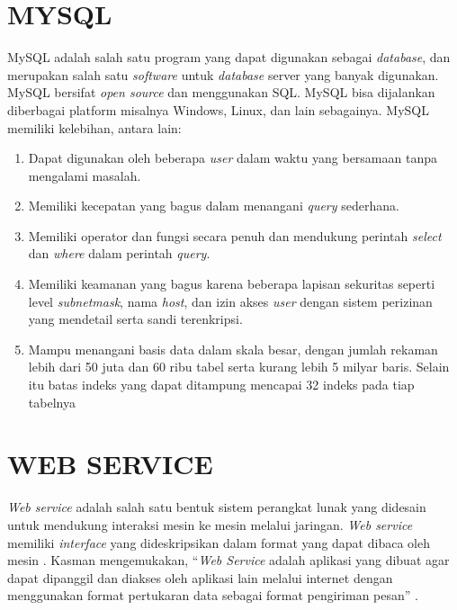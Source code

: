 
\section{\uppercase{MySQL}}
MySQL adalah salah satu program yang dapat digunakan sebagai \textit{database}, dan merupakan salah satu \textit{software} untuk \textit{database} server yang banyak digunakan. MySQL bersifat \textit{open source} dan menggunakan SQL. MySQL bisa dijalankan diberbagai platform misalnya Windows, Linux, dan lain sebagainya. MySQL memiliki kelebihan, antara lain: \citep{orlando2017aplikasi}

\begin{enumerate}
	\item Dapat digunakan oleh beberapa \textit{user} dalam waktu yang bersamaan tanpa mengalami masalah.	
	\item Memiliki kecepatan yang bagus dalam menangani \textit{query} sederhana.
	\item Memiliki operator dan fungsi secara penuh dan mendukung perintah \textit{select} dan \textit{where} dalam perintah \textit{query}.
	\item Memiliki keamanan yang bagus karena beberapa lapisan sekuritas seperti level \textit{subnetmask}, nama \textit{host}, dan izin akses \textit{user} dengan sistem perizinan yang mendetail serta sandi terenkripsi.
	\item Mampu menangani basis data dalam skala besar, dengan jumlah rekaman lebih dari 50 juta dan 60 ribu tabel serta kurang lebih 5 milyar baris. Selain itu batas indeks yang dapat ditampung mencapai 32 indeks pada tiap tabelnya
\end{enumerate}

\section{\uppercase{Web Service}}
\textit{Web service} adalah salah satu bentuk sistem perangkat lunak yang didesain untuk mendukung interaksi mesin ke mesin melalui jaringan. \textit{Web service} memiliki \textit{interface} yang dideskripsikan dalam format yang dapat dibaca oleh mesin \citep{prabowo2016teknologi}. Kasman mengemukakan, “\textit{Web Service} adalah aplikasi yang dibuat agar dapat dipanggil dan diakses oleh aplikasi lain melalui internet dengan menggunakan format pertukaran data sebagai format pengiriman pesan” \citep{kasman2015}.

